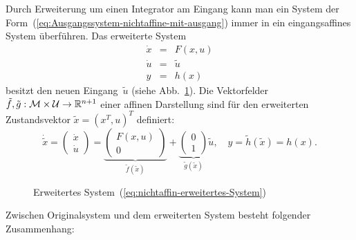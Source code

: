 Durch Erweiterung um einen Integrator am Eingang kann man ein System
der Form~(\ref{eq:Ausgangssystem-nichtaffine-mit-ausgang}) immer
in ein eingangsaffines System überführen. Das erweiterte System 
\begin{equation}
\begin{array}{ccl}
\dot{x} & = & F(x,u)\\
\dot{u} & = & \tilde{u}\\
y & = & h(x)
\end{array}\label{eq:nichtaffin-erweitertes-System}
\end{equation}
besitzt den neuen Eingang~$\tilde{u}$ (siehe Abb.~\ref{fig:Nichtaffines-System-mit-Integrator}).
Die Vektorfelder $\tilde{f},\tilde{g}:\mathcal{M}\times\mathcal{U}\to{\mathbb{R}}^{n+1}$
einer affinen Darstellung sind für den erweiterten Zustandsvektor
$\tilde{x}=(x^{T},u)^{T}$ definiert:
\begin{equation}
\dot{\tilde{x}}=\left(\begin{array}{c}
\dot{x}\\
\dot{u}
\end{array}\right)=\underbrace{\left(\begin{array}{c}
F(x,u)\\
0
\end{array}\right)}_{{\displaystyle \tilde{f}(\tilde{x})}}+\underbrace{\left(\begin{array}{c}
0\\
1
\end{array}\right)}_{{\displaystyle \tilde{g}(\tilde{x})}}\tilde{u},\quad y=\tilde{h}(\tilde{x})=h(x).\label{eq:nichtaffin-erweitertes-System2}
\end{equation}

\begin{figure}
\begin{centering}
\resizebox{0.85\textwidth}{!}{}
\par\end{centering}
\caption{Erweitertes System~(\ref{eq:nichtaffin-erweitertes-System}) \label{fig:Nichtaffines-System-mit-Integrator}}
\end{figure}

Zwischen Originalsystem und dem erweiterten System besteht folgender
Zusammenhang:

